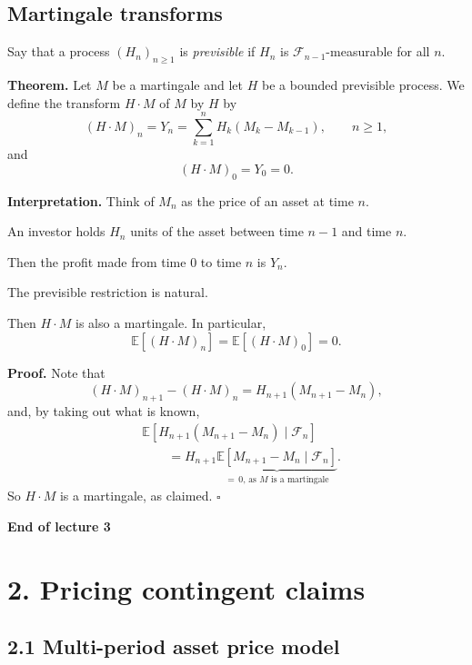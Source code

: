 \documentclass[11pt,a4paper]{article}
\begin{document}
\subsection*{Martingale transforms}

Say that a process $(H_n)_{n\geq 1}$ is \emph{previsible} if $H_n$ is $\mathcal{F}_{n-1}$-measurable for all $n$.

\medskip

\noindent\textbf{Theorem.}
Let $M$ be a martingale and let $H$ be a bounded previsible process. We define the transform $H\cdot M$ of $M$ by $H$ by
\[
(H\cdot M)_n
=
Y_n
=
\sum_{k=1}^{n}H_k(M_k-M_{k-1}),
\qquad n\geq 1,
\]
and
\[
(H\cdot M)_0=Y_0=0.
\]

\medskip

\noindent\textbf{Interpretation.}
Think of $M_n$ as the price of an asset at time $n$.

An investor holds $H_n$ units of the asset between time $n-1$ and time $n$.

Then the profit made from time $0$ to time $n$ is $Y_n$.

The previsible restriction is natural.

\medskip

Then $H\cdot M$ is also a martingale. In particular,
\[
\mathbb{E}[(H\cdot M)_n]
=
\mathbb{E}[(H\cdot M)_0]
=
0.
\]

\noindent\textbf{Proof.}
Note that
\[
(H\cdot M)_{n+1}-(H\cdot M)_n
=
H_{n+1}(M_{n+1}-M_n),
\]
and, by taking out what is known,
\[
\begin{aligned}
&\mathbb{E}\left[
H_{n+1}(M_{n+1}-M_n)\mid\mathcal{F}_n
\right]\\
&\qquad=
H_{n+1}
\underbrace{
\mathbb{E}[M_{n+1}-M_n\mid\mathcal{F}_n]
}_{=\,0\text{, as }M\text{ is a martingale}}.
\end{aligned}
\]
So $H\cdot M$ is a martingale, as claimed.
\hfill$\square$

\begin{center}
\textbf{End of lecture 3}
\end{center}

\section*{2. Pricing contingent claims}

\subsection*{2.1 Multi-period asset price model}
\end{document}
